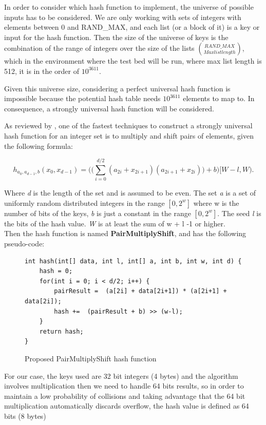 \documentclass[a4paper,12pt]{article}
\begin{document}
In order to consider which hash function to implement, the universe of possible inputs has to be considered. We are only working with sets of integers with elements between 0 and RAND\_MAX, and each list (or a block of it) is a key or input for the hash function. 
Then the size of the universe of keys is the combination of the range of integers over the size of the lists $\binom{RAND\_MAX}{Max list length} $, which in the environment where the test bed will be run, where max list length is 512, it is in the order of $10^{3611}$.

Given this universe size, considering a perfect universal hash function is impossible because the potential hash table needs $10^{3611}$ elements to map to. In consequence, a strongly universal hash function will be considered.

As reviewed by \cite{thorup2015high}, one of the fastest techniques to construct a strongly universal hash function for an integer set is to multiply and shift pairs of elements, given the following formula:

\begin{equation}
	h_{a_0,a_{d-1},b} (x_0, x_{d-1}) = \Bigg(\Bigg( \sum_{i=0}^{d/2} (a_{2i} + x_{2i+1})  (a_{2i+1} + x_{2i})\Bigg)  + b\Bigg) [W-l, W).
\end{equation}

Where {\it d}  is the length of the set and is assumed to be even. The set {\it a} is a set of uniformly random distributed integers in the  range $[0,2^w]$ where w is the number of bits of the keys, {\it b}  is just a constant in the range $[0,2^w]$. The seed {\it l}  is the bits of the hash value. {\it W}  is at least the sum of w + l -1 or higher. \\
Then the hash function is named {\bf PairMultiplyShift}, and has the following pseudo-code:

\begin{figure}[H]
\begin{verbatim}
int hash(int[] data, int l, int[] a, int b, int w, int d) {
    hash = 0;
    for(int i = 0; i < d/2; i++) {
        pairResult =  (a[2i] + data[2i+1]) * (a[2i+1] + data[2i]);
        hash +=  (pairResult + b) >> (w-l);
    }
    return hash;
}
\end{verbatim}
\caption{Proposed PairMultiplyShift hash function}
\end{figure}

For our case, the keys used are 32 bit integers (4 bytes) and the algorithm involves multiplication then we need to handle 64 bits results, so in order to maintain a low probability of collisions and taking advantage that the 64 bit multiplication automatically discards overflow,  the hash value is defined as 64 bits (8 bytes)
\\
\end{document}
